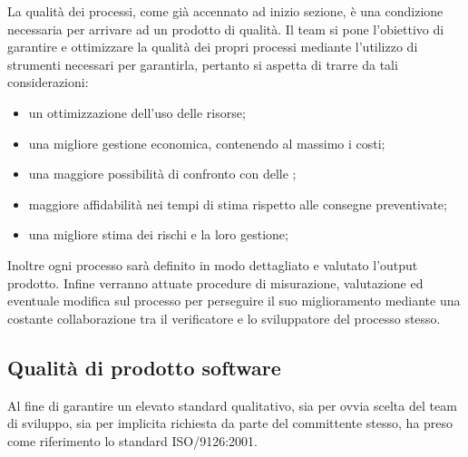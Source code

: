 La qualità dei processi, come già accennato ad inizio sezione, è una condizione necessaria per arrivare ad un prodotto di qualità. Il team si pone l'obiettivo di garantire e ottimizzare la qualità dei propri processi mediante l'utilizzo di strumenti necessari per garantirla, pertanto si aspetta di trarre da tali considerazioni:

\begin {itemize}
\item [-] un ottimizzazione dell'uso delle risorse;
\item [-] una migliore gestione economica, contenendo al massimo i costi;
\item [-] una maggiore possibilità di confronto con delle ;
\item [-] maggiore affidabilità nei tempi di stima rispetto alle consegne preventivate;
\item [-] una migliore stima dei rischi e la loro gestione;
\end {itemize}

Inoltre ogni processo sarà definito in modo dettagliato e valutato l'output prodotto. Infine verranno attuate procedure di misurazione, valutazione ed eventuale modifica sul processo per perseguire il suo miglioramento mediante una costante collaborazione tra il verificatore e lo sviluppatore del processo stesso.

\subsection{Qualità di prodotto software}
Al fine di garantire un elevato standard qualitativo, sia per ovvia scelta del team di sviluppo, sia per implicita richiesta da parte del committente stesso, \team{} ha preso come riferimento lo standard ISO/9126:2001.

